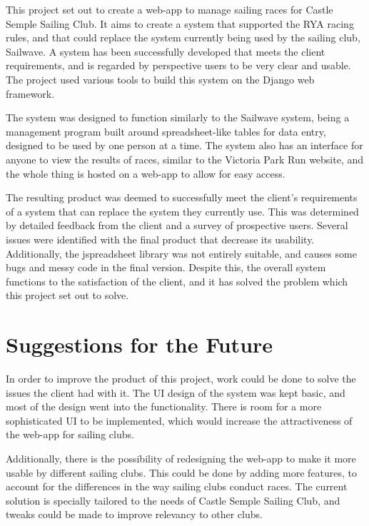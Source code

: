 \documentclass{l4proj}
\begin{document}
This project set out to create a web-app to manage sailing races for Castle Semple Sailing Club. It aims to create a system that supported the RYA racing rules, and that could replace the system currently being used by the sailing club, Sailwave. A system has been successfully developed that meets the client requirements, and is regarded by perspective users to be very clear and usable. The project used various tools to build this system on the Django web framework. 

The system was designed to function similarly to the Sailwave system, being a management program built around spreadsheet-like tables for data entry, designed to be used by one person at a time. The system also has an interface for anyone to view the results of races, similar to the Victoria Park Run website, and the whole thing is hosted on a web-app to allow for easy access.

The resulting product was deemed to successfully meet the client's requirements of a system that can replace the system they currently use. This was determined by detailed feedback from the client and a survey of prospective users. Several issues were identified with the final product that decrease its usability. Additionally, the jspreadsheet library was not entirely suitable, and causes some bugs and messy code in the final version. Despite this, the overall system functions to the satisfaction of the client, and it has solved the problem which this project set out to solve.

\section{Suggestions for the Future}

In order to improve the product of this project, work could be done to solve the issues the client had with it. The UI design of the system was kept basic, and most of the design went into the functionality. There is room for a more sophisticated UI to be implemented, which would increase the attractiveness of the web-app for sailing clubs. 

Additionally, there is the possibility of redesigning the web-app to make it more usable by different sailing clubs. This could be done by adding more features, to account for the differences in the way sailing clubs conduct races. The current solution is specially tailored to the needs of Castle Semple Sailing Club, and tweaks could be made to improve relevancy to other clubs.
\end{document}
